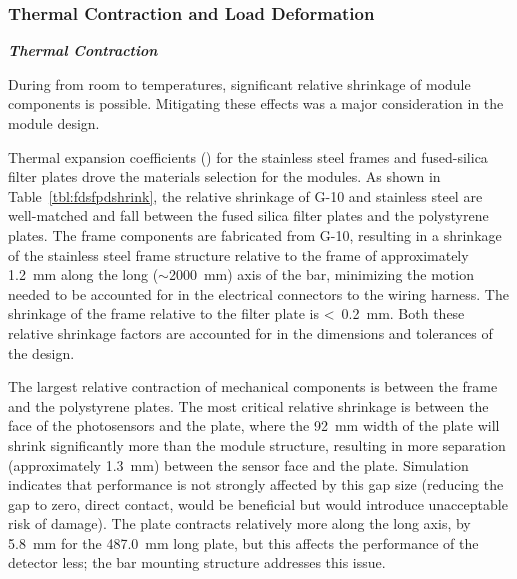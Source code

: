 \subsubsection{Thermal Contraction and Load Deformation}
\label{sssec:pds-thermal-load}
\textit{\bf Thermal Contraction}

During \cooldown from room 
to  temperatures,  significant relative shrinkage of module components is possible.  Mitigating these effects was a major consideration in the  module design.

Thermal expansion coefficients () for the stainless steel  frames and fused-silica filter plates drove the materials selection for the  modules.  As shown in Table~\ref{tbl:fdsfpdshrink},  the relative shrinkage of \frfour G-10 and stainless steel are well-matched and fall between the fused silica filter plates and the polystyrene  plates. The frame components are fabricated from \frfour G-10, resulting in a shrinkage of the stainless steel frame structure relative to the frame of approximately \SI{1.2}{mm} along the long ($\sim$\SI{2000}{mm}) axis of the bar, minimizing the motion needed to be accounted for in the electrical connectors to the wiring harness.  The shrinkage of the frame relative to the filter plate is <~\SI{0.2}{mm}.  Both these relative shrinkage factors are accounted for in the dimensions and tolerances of the design.

The largest relative contraction of mechanical components is between the \frfour frame and the polystyrene  plates. The most critical relative shrinkage is between the face of the photosensors and the  plate, where the \SI{92}{mm} width of the plate will shrink significantly more than the  module structure, resulting in more separation (approximately \SI{1.3}{mm}) between the sensor face and the plate.
 Simulation indicates that  performance is not strongly affected by this gap size (reducing the gap to zero, direct contact, would be beneficial but would introduce unacceptable risk of damage).  %
 The  plate contracts relatively more along the long axis, by \SI{5.8}{mm} for the \SI{487.0}{mm} long plate, but this affects the performance of the detector less; the  bar mounting structure addresses this issue.


